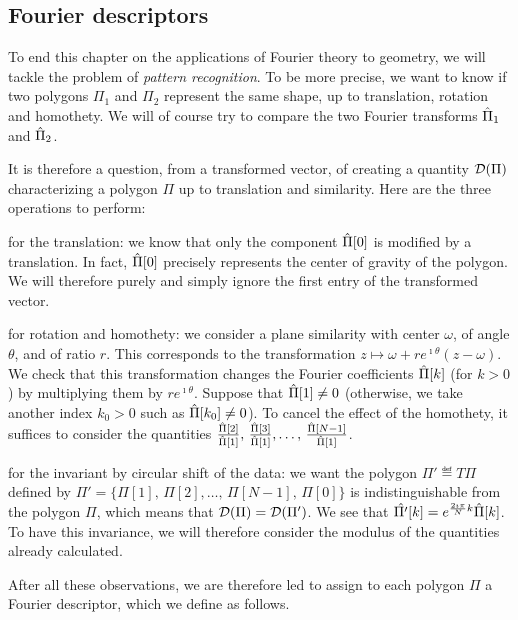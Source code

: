\subsection{Fourier descriptors}
 
 
 To end this chapter on the applications of Fourier theory to geometry, we will tackle the problem of \textit{pattern recognition}. To be more precise, we want to know if two polygons $ \Pi_1 $ and $ \Pi_2 $ represent the same shape, up to translation, rotation and homothety. We will of course try to compare the two Fourier transforms $ \hat{\Pi}_1 $ and $ \hat{\Pi}_2 $.
 
 
It is therefore a question, from a transformed vector, of creating a quantity $ \mathcal{D} (\Pi) $ characterizing a polygon $ \Pi $ up to translation and similarity. Here are the three operations to perform: \begin{rs}
\item {} for the translation: we know that only the component $ \hat{\Pi}[0] $ is modified by a translation. In fact, $ \hat{\Pi}[0] $ precisely represents the center of gravity of the polygon. We will therefore purely and simply ignore the first entry of the transformed vector.
\item {}   for rotation and homothety: we consider a plane similarity with center $ \omega $, of angle $ \theta $, and of ratio $ r $. This corresponds to the transformation $ z \mapsto \omega + re^{\imath \theta} (z - \omega) $. We check that this transformation changes the Fourier coefficients $ \hat{\Pi}[k] $ (for $ k> 0 $) by multiplying them by $ re^{\imath \theta} $. Suppose that $ \hat{\Pi}[1] \neq 0 $ (otherwise, we take another index $ k_0> 0 $ such as $ \hat{\Pi}[k_0] \neq 0 $). To cancel the effect of the homothety, it suffices to consider the quantities $ \frac{\hat{\Pi}[2]}{\hat{\Pi}[1]}, \, \frac{\hat{\Pi}[3]}{\hat{\Pi}[1]}, \ldots, \, \frac{\hat{\Pi}[N-1]}{\hat{\Pi}[1]} $.
\item for the invariant by circular shift of the data: we want the polygon $ \Pi'\eqdef T \Pi $ defined by $ \Pi' = \{\Pi [1], \, \Pi [2], \ldots, \, \Pi [N-1], \, \Pi [0] \} $ is indistinguishable from the polygon $ \Pi $, which means that $ \mathcal{D} (\Pi) = \mathcal{D} (\Pi' ) $. We see that $ \hat{\Pi'}[k] = e^{\frac{2 \imath \pi}{N} k} \hat{\Pi}[k] $. To have this invariance, we will therefore consider the modulus of the quantities already calculated.
\end{rs} After all these observations, we are therefore led to assign to each polygon $ \Pi $ a Fourier descriptor, which we define as follows.
 
